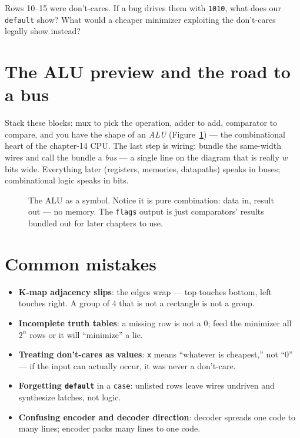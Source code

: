 \begin{exercise}[medium]
Rows 10--15 were don't-cares. If a bug drives them with \texttt{1010},
what does our \texttt{default} show? What would a cheaper minimizer
exploiting the don't-cares legally show instead?
\end{exercise}

\section{The ALU preview and the road to a bus}
\label{sec:alu}

Stack these blocks: mux to pick the operation, adder to add, comparator
to compare, and you have the shape of an \emph{ALU}
(Figure~\ref{fig:alu}) — the combinational heart of the chapter-14 CPU.
The last step is wiring: bundle the same-width wires and call the bundle
a \emph{bus} — a single line on the diagram that is really
$w$ bits wide. Everything later (registers, memories, datapaths) speaks
in buses; combinational logic speaks in bits.

\begin{figure}[htbp]
\centering

\caption{The ALU as a symbol. Notice it is pure combination: data in,
result out — no memory. The \texttt{flags} output is just comparators'
results bundled out for later chapters to use.}
\label{fig:alu}
\end{figure}

\section{Common mistakes}
\label{sec:mistakes09}

\begin{itemize}
\item \textbf{K-map adjacency slips}: the edges wrap — top touches
bottom, left touches right. A group of 4 that is not a rectangle is not
a group.
\item \textbf{Incomplete truth tables}: a missing row is not a 0; feed
the minimizer all $2^n$ rows or it will ``minimize'' a lie.
\item \textbf{Treating don't-cares as values}: \texttt{x} means
``whatever is cheapest,'' not ``0'' — if the input can actually occur,
it was never a don't-care.
\item \textbf{Forgetting \texttt{default}} in a \texttt{case}: unlisted
rows leave wires undriven and synthesize latches, not logic.
\item \textbf{Confusing encoder and decoder direction}: decoder spreads
one code to many lines; encoder packs many lines to one code.
\end{itemize}

